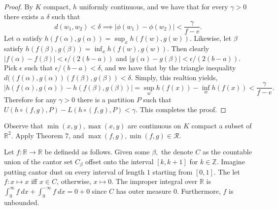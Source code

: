 \documentclass[letter]{article}
\newenvironment{menumerate}{%
  \edef\backupindent{\the\parindent}%
  \enumerate%
  \setlength{\parindent}{\backupindent}%
}{\endenumerate}
\begin{document}
\begin{menumerate}
\begin{proof}
		By $K$ compact, $h$ uniformly continuous, and we have that for every $\gamma > 0$ there exists a $\delta$ such that 
			$$d(w_1,w_2) < \delta \implies |\phi(w_1) - \phi(w_2)| < \frac{\gamma}{f-e}.$$ 
		Let $\alpha$ satisfy $h(f(\alpha),g(\alpha)) = \sup_x h(f(w),g(w)).$ Likewise, let $\beta$ satisfy $h(f(\beta),g(\beta)) = \inf_x h(f(w),g(w)).$ 
		 Then clearly $|f(\alpha) - f(\beta)| < \epsilon/(2(b-a))$ and $|g(\alpha) - g(\beta)| < \epsilon/(2(b-a)).$
		  Pick $\epsilon$ such that $\epsilon/(b-a) < \delta$, and we have that by the triangle inequality $d((f(\alpha),g(\alpha))(f(\beta),g(\beta)) < \delta$. Simply, this realtion yields,
		  	$$|h(f(\alpha),g(\alpha)) - h(f(\beta),g(\beta))| = \sup_w h(f(x)) - \inf_w h(f(x)) < \frac{\gamma}{f-e}.$$
		  Therefore for any $\gamma > 0$ there is a partition $P$ such that $U(h \circ (f,g), P) - L (h \circ (f,g), P) <\gamma.$ This completes the proof.
	\end{proof}

	Observe that $\min(x,y), \max(x,y)$ are continuous on $K$ compact a subset of $\mathbb{R}^2.$ Apply Theorem 7, and $\max(f,g),\min(f,g) \in \mathcal{R}.$

	\setcounter{enumi}{54}
	\item Let $f:\mathbb{R}\to\mathbb{R}$ be definedd as follows. Given some $\beta,$ the denote $C$ as the countable union of the cantor set $C_\beta$ offset onto the interval $[k,k+1]$ for $k \in \mathbb{Z}$. Imagine putting cantor dust on every interval of length $1$ starting from $[0,1]$. The let $f: x \mapsto x$ iff $x \in C$, otherwise, $x \mapsto 0$. The improper integral over $\mathbb{R}$ is $\int_0^\infty f
	\  dx + \int_0^{-\infty} f\  dx = 0 + 0$ since $C$ has outer measure 0. Furthermore, $f$ is unbounded.

\end{menumerate}
\end{document}
